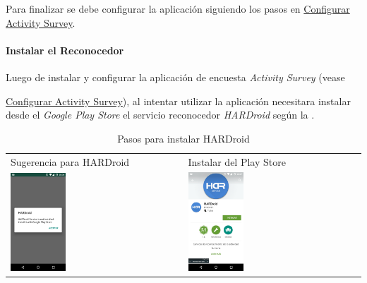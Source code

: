 Para finalizar se debe configurar la aplicación siguiendo los pasos en \hyperref[config:har-config]{Configurar Activity Survey}.


\paragraph{Instalar el Reconocedor}
\label{first:instalar-el-reconocedor}
Luego de instalar y configurar la aplicación de encuesta \emph{Activity Survey} (vease {\hyperref[config:har-config]{Configurar Activity Survey}),
al intentar utilizar la aplicación necesitara instalar desde el \emph{Google Play Store} el servicio reconocedor \emph{HARDroid} según la .

\begin{table}[h]
\begin{tabular}{ll}
\textsf{\relax 
Sugerencia para HARDroid
} & \textsf{\relax 
Instalar del Play Store
}\\
    {\includegraphics[width=0.33\textwidth]{anexos/graphics/install_service.jpg}}
 & 
    {\includegraphics[width=0.33\textwidth]{anexos/graphics/inst_servplay.jpg}}
\\
\end{tabular}
    \caption{Pasos para instalar HARDroid}\label{tab:hardroid}
\end{table}

}
